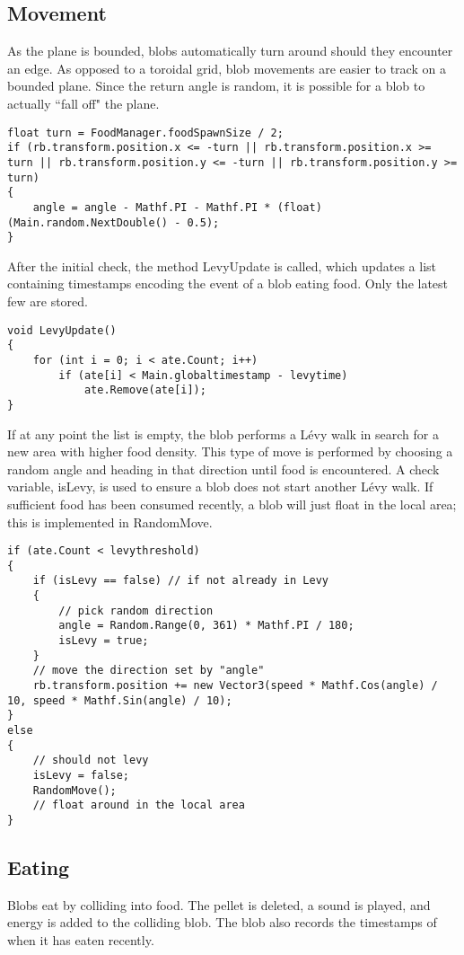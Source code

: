 \subsection{Movement} \label{moveme}
As the plane is bounded, blobs automatically turn around should they encounter an edge. As opposed to a toroidal grid, blob movements are easier to track on a bounded plane. Since the return angle is random, it is possible for a blob to actually ``fall off" the plane.

\begin{lstlisting}
float turn = FoodManager.foodSpawnSize / 2;
if (rb.transform.position.x <= -turn || rb.transform.position.x >= turn || rb.transform.position.y <= -turn || rb.transform.position.y >= turn)
{
    angle = angle - Mathf.PI - Mathf.PI * (float)(Main.random.NextDouble() - 0.5);
}
\end{lstlisting}	
	
After the initial check, the method LevyUpdate is called, which updates a list containing timestamps encoding the event of a blob eating food. Only the latest few are stored.

\begin{lstlisting}
void LevyUpdate()
{
    for (int i = 0; i < ate.Count; i++)
        if (ate[i] < Main.globaltimestamp - levytime)
	        ate.Remove(ate[i]);
}
\end{lstlisting}

If at any point the list is empty, the blob performs a L\'evy walk in search for a new area with higher food density. This type of move is performed by choosing a random angle and heading in that direction until food is encountered. A check variable, isLevy, is used to ensure a blob does not start another L\'evy walk. If sufficient food has been consumed recently, a blob will just float in the local area; this is implemented in RandomMove.

\begin{lstlisting}
if (ate.Count < levythreshold)
{
    if (isLevy == false) // if not already in Levy
    {
        // pick random direction
        angle = Random.Range(0, 361) * Mathf.PI / 180;
        isLevy = true;
    }
    // move the direction set by "angle"
    rb.transform.position += new Vector3(speed * Mathf.Cos(angle) / 10, speed * Mathf.Sin(angle) / 10);
}
else
{
    // should not levy
    isLevy = false;
    RandomMove();
    // float around in the local area
}
\end{lstlisting}

\subsection{Eating}
Blobs eat by colliding into food. The pellet is deleted, a sound is played, and energy is added to the colliding blob. The blob also records the timestamps of when it has eaten recently.

